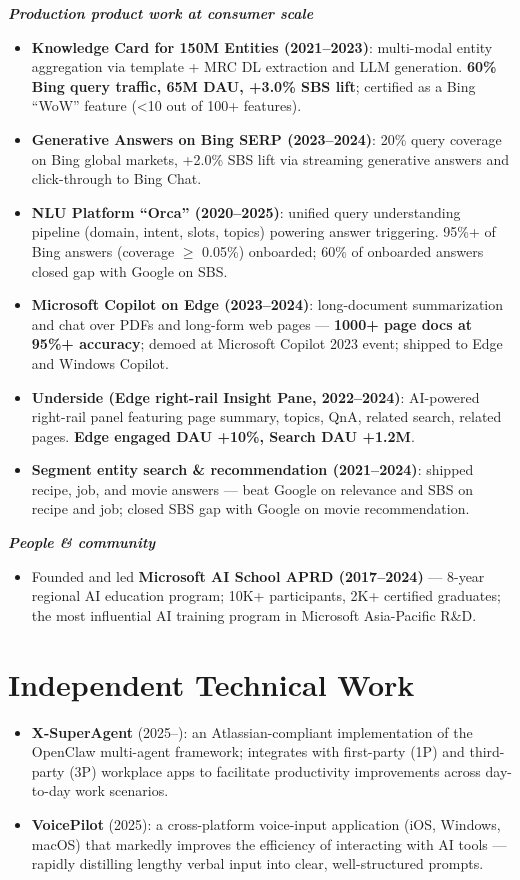 \documentclass[10.5pt,letterpaper]{article}
\newcommand{\expgroup}[1]{\smallskip\noindent\textbf{\textit{#1}}\par\vspace{1pt}}
\begin{document}
\expgroup{Production product work at consumer scale}
\begin{itemize}
  \item \textbf{Knowledge Card for 150M Entities (2021--2023)}: multi-modal entity aggregation via template + MRC DL extraction and LLM generation. \textbf{60\% Bing query traffic, 65M DAU, +3.0\% SBS lift}; certified as a Bing ``WoW'' feature (<10 out of 100+ features).
  \item \textbf{Generative Answers on Bing SERP (2023--2024)}: 20\% query coverage on Bing global markets, +2.0\% SBS lift via streaming generative answers and click-through to Bing Chat.
  \item \textbf{NLU Platform ``Orca'' (2020--2025)}: unified query understanding pipeline (domain, intent, slots, topics) powering answer triggering. 95\%+ of Bing answers (coverage $\ge$ 0.05\%) onboarded; 60\% of onboarded answers closed gap with Google on SBS.
  \item \textbf{Microsoft Copilot on Edge (2023--2024)}: long-document summarization and chat over PDFs and long-form web pages --- \textbf{1000+ page docs at 95\%+ accuracy}; demoed at Microsoft Copilot 2023 event; shipped to Edge and Windows Copilot.
  \item \textbf{Underside (Edge right-rail Insight Pane, 2022--2024)}: AI-powered right-rail panel featuring page summary, topics, QnA, related search, related pages. \textbf{Edge engaged DAU +10\%, Search DAU +1.2M}.
  \item \textbf{Segment entity search \& recommendation (2021--2024)}: shipped recipe, job, and movie answers --- beat Google on relevance and SBS on recipe and job; closed SBS gap with Google on movie recommendation.
\end{itemize}

\expgroup{People \& community}
\begin{itemize}
  \item Founded and led \textbf{Microsoft AI School APRD (2017--2024)} --- 8-year regional AI education program; 10K+ participants, 2K+ certified graduates; the most influential AI training program in Microsoft Asia-Pacific R\&D.
\end{itemize}

\section*{Independent Technical Work}
\begin{itemize}
  \item \textbf{X-SuperAgent} (2025--): an Atlassian-compliant implementation of the OpenClaw multi-agent framework; integrates with first-party (1P) and third-party (3P) workplace apps to facilitate productivity improvements across day-to-day work scenarios.
  \item \textbf{VoicePilot} (2025): a cross-platform voice-input application (iOS, Windows, macOS) that markedly improves the efficiency of interacting with AI tools --- rapidly distilling lengthy verbal input into clear, well-structured prompts.
\end{itemize}
\end{document}
